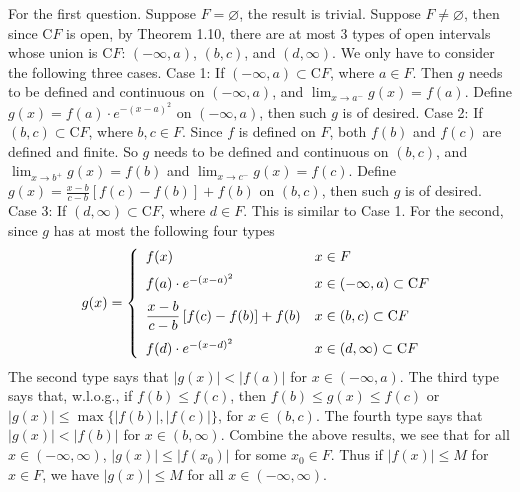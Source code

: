 \documentclass[12pt]{article}
\theoremstyle{definition}
\begin{document}
For the first question. Suppose $F=\varnothing$, the result is trivial. Suppose $F\ne\varnothing$, then since $\mathrm{C}F$ is open, by Theorem 1.10, there are at most 3 types of open intervals whose union is $\mathrm{C}F$: $(-\infty,a)$, $(b,c)$, and $(d,\infty)$. We only have to consider the following three cases.
Case 1: If $(-\infty,a)\subset\mathrm{C}F$, where $a\in F$. Then $g$ needs to be defined and continuous on $(-\infty,a)$, and $\lim_{x\to a^-}g(x)=f(a)$. Define $g(x)=f(a)\cdot e^{-(x-a)^2}$ on $(-\infty,a)$, then such $g$ is of desired.
Case 2: If $(b,c)\subset\mathrm{C}F$, where $b,c\in F$. Since $f$ is defined on $F$, both $f(b)$ and $f(c)$ are defined and finite. So $g$ needs to be defined and continuous on $(b,c)$, and $\lim_{x\to b^+}g(x)=f(b)$ and $\lim_{x\to c^-}g(x)=f(c)$. Define $g(x)=\frac{x-b}{c-b}\left[f(c)-f(b)\right]+f(b)$ on $(b,c)$, then such $g$ is of desired.
Case 3: If $(d,\infty)\subset\mathrm{C}F$, where $d\in F$. This is similar to Case 1.
For the second, since $g$ has at most the following four types
\begin{align*}
g(x)
=\left\{\begin{array}{ll}
f(x)&x\in F \vspace{0.08in}\\
f(a)\cdot e^{-(x-a)^2}&x\in(-\infty,a)\subset\mathrm{C}F \vspace{0.08in}\\
\dfrac{x-b}{c-b}\left[f(c)-f(b)\right]+f(b)&x\in(b,c)\subset\mathrm{C}F \vspace{0.08in}\\
f(d)\cdot e^{-(x-d)^2} & x\in(d,\infty)\subset\mathrm{C}F
\end{array}\right.
\end{align*}
The second type says that $\left\vert g(x)\right\vert<\left\vert f(a)\right\vert$ for $x\in(-\infty,a)$. The third type says that, w.l.o.g., if $f(b)\le f(c)$, then $f(b)\le g(x)\le f(c)$ or $\left\vert g(x)\right\vert\le\max\{\left\vert f(b)\right\vert,\left\vert f(c)\right\vert\}$, for $x\in(b,c)$. The fourth type says that $\left\vert g(x)\right\vert<\left\vert f(b)\right\vert$ for $x\in(b,\infty)$. Combine the above results, we see that for all $x\in(-\infty,\infty)$, $\left\vert g(x)\right\vert\le \left\vert f(x_0)\right\vert$ for some $x_0\in F$. Thus if $\left\vert f(x)\right\vert\le M$ for $x\in F$, we have $\left\vert g(x)\right\vert\le M$ for all $x\in(-\infty,\infty)$.
\end{document}
